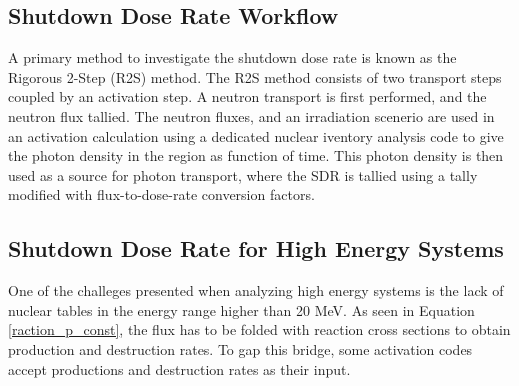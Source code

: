 \subsection{Shutdown Dose Rate Workflow}

A primary method to investigate the shutdown dose rate is known as the
Rigorous 2-Step (R2S) method. The R2S method consists of two transport steps
coupled by an activation step. 
A neutron transport is first performed, and the neutron flux tallied.
The neutron fluxes, and an irradiation scenerio are used in an activation
calculation using a dedicated nuclear iventory analysis code to give the 
photon density in the region as function of time. 
This photon density is then used as a source for photon transport,
where the SDR is tallied using a tally modified with flux-to-dose-rate
conversion factors.



\subsection{Shutdown Dose Rate for High Energy Systems}
One of the challeges presented when analyzing high energy systems is the 
lack of nuclear tables in the energy range higher than 20 MeV. 
As seen in Equation \ref{raction_p_const}, the flux has to be folded 
with reaction cross sections to obtain production and destruction rates.
To gap this bridge, some activation codes accept productions and destruction rates
as their input.




